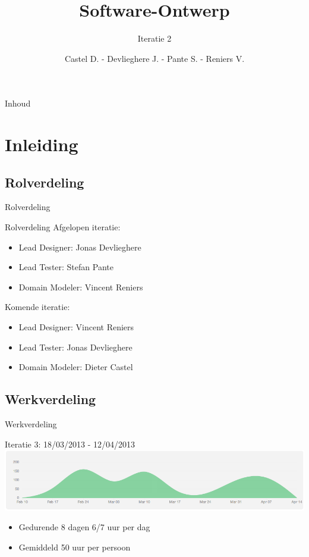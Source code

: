 \documentclass[t]{beamer}
\title{Software-Ontwerp}
\subtitle{Iteratie 2}
\author{Castel D. - Devlieghere J. - Pante S. - Reniers V.}
\institute{KU Leuven}
\begin{document}
\frame{\titlepage} 
\begin{frame}{Inhoud}
\begin{multicols}{2}
\tableofcontents
\end{multicols}
\end{frame}



\section{Inleiding} 

\subsection{Rolverdeling}
\begin{frame}{Rolverdeling}
\begin{multicols}{2}
\tableofcontents[currentsection]
\end{multicols}
\end{frame}

\begin{frame}{Rolverdeling}
Afgelopen iteratie:
\begin{itemize}
	\item Lead Designer: Jonas Devlieghere
	\item Lead Tester: Stefan Pante
	\item Domain Modeler: Vincent Reniers
\end{itemize}
Komende iteratie:
\begin{itemize}
	\item Lead Designer: Vincent Reniers
	\item Lead Tester: Jonas Devlieghere
	\item Domain Modeler: Dieter Castel
\end{itemize}
\end{frame}

\subsection{Werkverdeling}

\begin{frame}{Werkverdeling}
\begin{center}
Iteratie 3: 18/03/2013 - 12/04/2013
\includegraphics[width= 0.90\linewidth]{images/workload}
\end{center}
\begin{itemize}
	\item Gedurende 8 dagen 6/7 uur per dag
	\item Gemiddeld 50 uur per persoon
\end{itemize}

\end{frame}
\end{document}
